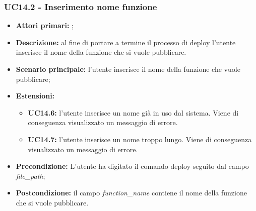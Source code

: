 \subsubsection{UC14.2 - Inserimento nome funzione}
\begin{itemize}
	\item \textbf{Attori primari:} \us{};
	\item \textbf{Descrizione:} al fine di portare a termine il processo di deploy l’utente inserisce il nome della funzione che si vuole pubblicare.  
	\item \textbf{Scenario principale:} l'utente inserisce il nome della funzione che vuole pubblicare;
	\item \textbf{Estensioni:} 
	\begin{itemize}
		\item \textbf{UC14.6:} l’utente inserisce un nome già in uso dal sistema. Viene di conseguenza visualizzato un messaggio di errore. 
		\item \textbf{UC14.7:} l’utente inserisce un nome troppo lungo. Viene di conseguenza visualizzato un messaggio di errore. 
	\end{itemize}
	\item \textbf{Precondizione:} L’utente ha digitato il comando deploy seguito dal campo \textit{file\_path};
	\item \textbf{Postcondizione:} il campo \textit{function\_name} contiene il nome della funzione che si vuole pubblicare.
\end{itemize}